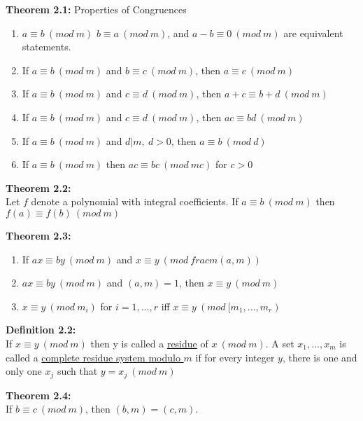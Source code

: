 \documentclass[a4paper]{article}
\begin{document}
\textbf{Theorem 2.1:} Properties of Congruences
\begin{enumerate}
    \item $a\equiv b\ (mod\ m)$ $b\equiv a\ (mod\ m)$,
    and $a-b\equiv 0\ (mod\ m)$ are equivalent statements.
    \item If $a\equiv b\ (mod\ m)$ and $b\equiv c\ (mod\ m)$,
    then $a\equiv c\ (mod\ m)$
    \item If $a\equiv b\ (mod\ m)$ and $c\equiv d\ (mod\ m)$,
    then $a+c\equiv b+d\ (mod\ m)$
    \item If $a\equiv b\ (mod\ m)$ and $c\equiv d\ (mod\ m)$,
    then $ac\equiv bd\ (mod\ m)$
    \item If $a\equiv b\ (mod\ m)$ and $d|m,\ d>0$,
    then $a\equiv b\ (mod\ d)$
    \item If $a\equiv b\ (mod\ m)$
    then $ac\equiv bc\ (mod\ mc)$ for $c>0$
\end{enumerate}

\textbf{Theorem 2.2:}\\
Let $f$ denote a polynomial with integral coefficients. If $a\equiv b\ (mod\ m)$
then $f(a)\equiv f(b)\ (mod\ m)$

\textbf{Theorem 2.3:}
\begin{enumerate}
    \item If $ax\equiv by\ (mod\ m)$ and $x\equiv y\ (mod\ frac{m}{(a,m)})$
    \item $ax\equiv by\ (mod\ m)$ and $(a,m)=1$, then $x\equiv y\ (mod\ m)$
    \item $x\equiv y\ (mod\ m_i)$ for $i=1,...,r$ iff $x\equiv y\ (mod\ [m_1,...,m_r)$
\end{enumerate}


\textbf{Definition 2.2:}\\
If $x\equiv y\ (mod\ m)$ then y is called a \underline{residue} of $x\ (mod\ m)$.
A set $x_1,...,x_m$ is called a \underline{complete residue system modulo $m$} if
for every integer $y$, there is one and only one $x_j$ such that $y=x_j\ (mod\ m)$

\textbf{Theorem 2.4:}\\
If $b\equiv c\ (mod\ m)$, then $(b,m)=(c,m)$.
\end{document}
